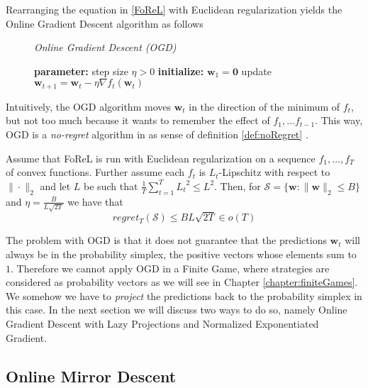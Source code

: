 Rearranging the equation in \ref{FoReL} with Euclidean regularization yields the Online Gradient Descent algorithm as follows

\begin{figure}[H]\centering
    \textit{Online Gradient Descent (OGD)}
    \begin{minipage}{.7\linewidth}
        \begin{algorithm}[H]
        \DontPrintSemicolon
        \textbf{parameter: }  step size $\eta > 0$ \;
        \textbf{initialize: } $\boldsymbol{w}_1 = \boldsymbol{0}$ \;
         {
        update $\boldsymbol{w}_{t+1} = \boldsymbol{w}_t - \eta\nabla f_t(\boldsymbol{w}_t)$ \;
        }
        \end{algorithm}\caption*{}
  \end{minipage}
\end{figure}

Intuitively, the OGD algorithm moves $\boldsymbol{w}_t$ in the direction of the minimum of $f_t$, but not too much because it wants to remember the effect of $f_1,\dots f_{t-1}$. This way, OGD is a \textit{no-regret} algorithm in as sense of definition \ref{def:noRegret} \cite[Cor. 2.7]{shalev}. 

\begin{proposition}\label{prop:EuclideanNoRegret}
    Assume that FoReL is run with Euclidean regularization on a sequence $f_1,\dots,f_T$ of convex functions. Further assume each $f_t$ is $L_t$-Lipschitz with respect to $\|\cdot\|_2$ and let $L$ be such that $\frac{1}{T}\sum_{t=1}^{T}{L_t}^2\le L^2$. Then, for $ \mathcal{S} = \{\boldsymbol{w}: \|\boldsymbol{w}\|_2 \le B\}$ and $\eta = \frac{B}{L\sqrt{2T}}$ we have that
    \[regret_T(\mathcal{S}) \le BL\sqrt{2T} \in o(T)\]
\end{proposition}

The problem with OGD is that it does not guarantee that the predictions $\boldsymbol{w}_t$ will always be in the probability simplex, the positive vectors whose elements sum to $1$. Therefore we cannot apply OGD in a Finite Game, where strategies are considered as probability vectors as we will see in Chapter \ref{chapter:finiteGames}. We somehow we have to \textit{project} the predictions back to the probability simplex in this case. In the next section we will discuss two ways to do so, namely Online Gradient Descent with Lazy Projections and Normalized Exponentiated Gradient. 


\subsection{Online Mirror Descent}\label{subsection:onlineMirrorAscent}

